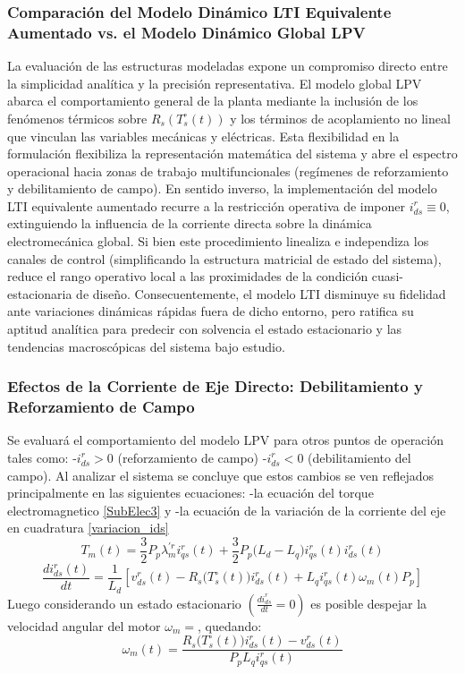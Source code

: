 \documentclass[blue,fullpaper]{ludusofficial}  %
\begin{document}
\subsubsection{Comparación del Modelo Dinámico LTI Equivalente Aumentado vs. el Modelo Dinámico Global LPV}
La evaluación de las estructuras modeladas expone un compromiso directo entre la simplicidad analítica y la precisión representativa. El modelo global LPV abarca el comportamiento general de la planta mediante la inclusión de los fenómenos térmicos sobre $R_s(T_s^\circ(t))$ y los términos de acoplamiento no lineal que vinculan las variables mecánicas y eléctricas. Esta flexibilidad en la formulación flexibiliza la representación matemática del sistema y abre el espectro operacional hacia zonas de trabajo multifuncionales (regímenes de reforzamiento y debilitamiento de campo).  En sentido inverso, la implementación del modelo LTI equivalente aumentado recurre a la restricción operativa de imponer $i^r_{ds} \equiv 0$, extinguiendo la influencia de la corriente directa sobre la dinámica electromecánica global. Si bien este procedimiento linealiza e independiza los canales de control (simplificando la estructura matricial de estado del sistema), reduce el rango operativo local a las proximidades de la condición cuasi-estacionaria de diseño. Consecuentemente, el modelo LTI disminuye su fidelidad ante variaciones dinámicas rápidas fuera de dicho entorno, pero ratifica su aptitud analítica para predecir con solvencia el estado estacionario y las tendencias macroscópicas del sistema bajo estudio. 

\subsubsection{Efectos de la Corriente de Eje Directo: Debilitamiento y Reforzamiento de Campo}
Se evaluará el comportamiento del modelo LPV para otros puntos de operación tales como: -$i_{ds}^r>0$ (reforzamiento de campo) -$i_{ds}^r<0$ (debilitamiento del campo). Al analizar el sistema se concluye que estos cambios se ven reflejados principalmente en las siguientes ecuaciones: -la ecuación del torque electromagnetico \eqref{SubElec3}   y -la ecuación de la variación de la corriente del eje en cuadratura \eqref{variacion_ids}
$$ T_{m}(t)   = \frac{3}{2}P_{p} \lambda_{m}^{'r} i_{qs}^{r}(t) + \frac{3}{2} P_{p} \Big( L_{d} - L_{q} \Big) i_{qs}^{r}(t) i_{ds}^{r}(t)$$
$$ \frac{di_{ds}^{r}(t)}{dt}  = \frac{1}{L_{d}} \left[ v_{ds}^{r}(t) - R_{s} \Big( T_{s}^{\circ} (t) \Big) i_{ds}^{r}(t) + L_{q}i_{qs}^{r}(t) \omega_{m}(t)P_{p}  \right] $$
Luego considerando un estado estacionario $(\frac{di_{ds}^r}{dt}=0)$ es posible despejar la velocidad angular del motor $\omega_m=$, quedando:
\begin{equation}
\label{eq:velocidad-equilibrio}
\omega_{m}(t) = \frac{R_{s} \Big( T_{s}^{\circ} (t) \Big) i_{ds}^{r}(t) - v_{ds}^{r}(t)}{P_{p} L_{q} i_{qs}^{r}(t)}
\end{equation}
\end{document}
